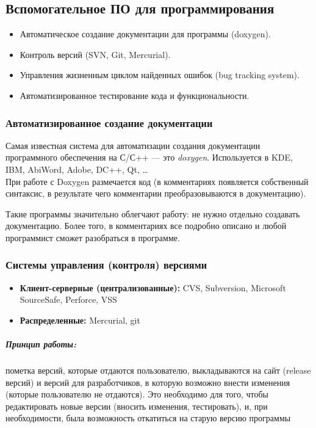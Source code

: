 \subsection{Вспомогательное ПО для программирования}\label{subsec:auxiliary-software-for-programming}

\begin{itemize}
    \item Автоматическое создание документации для программы (doxygen).
    \item Контроль версий (SVN, Git, Mercurial).
    \item Управления жизненным циклом найденных ошибок (bug tracking system).
    \item Автоматизированное тестирование кода и функциональности.
\end{itemize}

\subsubsection{Автоматизированное создание документации}\label{subsubsec:documentation-automation}
Самая известная система для автоматизации создания документации программного обеспечения на С/С++ --- это \emph{doxygen}.
Используется в KDE, IBM, AbiWord, Adobe, DC++, Qt, \dots \\
При работе с Doxygen размечается код (в комментариях появляется собственный синтаксис, в результате чего комментарии преобразовываются в документацию).

Такие программы значительно облегчают работу: не нужно отдельно создавать документацию. Более того, в комментариях все подробно описано и любой программист сможет разобраться в программе.

\subsubsection{Системы управления (контроля) версиями}\label{subsubsec:version-control-systems}

\begin{itemize}
    \item \textbf{Клиент-серверные (централизованные):} CVS, Subversion, Microsoft SourceSafe, Perforce, VSS
    \item \textbf{Распределенные:} Mercurial, git
\end{itemize}

\subparagraph{Принцип работы:} пометка версий, которые отдаются пользователю, выкладываются на сайт (release версий) и версий для разработчиков, в которую возможно внести изменения (которые пользователю не отдаются). Это необходимо для того, чтобы редактировать новые версии (вносить изменения, тестировать), и, при необходимости, была возможность откатиться на старую версию программы

